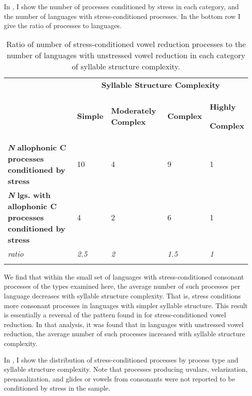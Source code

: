   In , I show the number of processes conditioned by stress in each category, and the number of languages with stress-conditioned processes. In the bottom row I give the ratio of processes to languages.

\begin{table}
\begin{tabularx}{\textwidth}{XXXXX}
\lsptoprule
 & \multicolumn{4}{c}{ \textbf{Syllable Structure Complexity}}\\
& \textbf{Simple} & \textbf{Moderately Complex} & \textbf{Complex} & { \textbf{Highly} }

 \textbf{Complex}\\
 \textbf{\textit{N}} \textbf{allophonic C processes conditioned by stress} & 10 & 4 & 9 & 1\\
 \textbf{\textit{N}} \textbf{lgs. with allophonic C processes conditioned by stress} & 4 & 2 & 6 & 1\\
 \textit{ratio} & \textit{2.5} & \textit{2} & \textit{1.5} & \textit{1}\\
\lspbottomrule
\end{tabularx}
\caption{\label{tab:7.8}Ratio of number of stress-conditioned vowel reduction processes to the number of languages with unstressed vowel reduction in each category of syllable structure complexity.}
\end{table}

  We find that within the small set of languages with stress-conditioned consonant processes of the types examined here, the average number of such processes per language decreases with syllable structure complexity. That is, stress conditions more consonant processes in languages with simpler syllable structure. This result is essentially a reversal of the pattern found in  for stress-conditioned vowel reduction. In that analysis, it was found that in languages with unstressed vowel reduction, the average number of such processes increased with syllable structure complexity.

  In , I show the distribution of stress-conditioned processes by process type and syllable structure complexity. Note that processes producing uvulars, velarization, prenasalization, and glides or vowels from consonants were not reported to be conditioned by stress in the sample.


